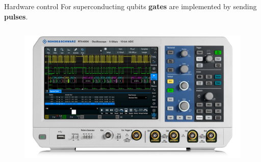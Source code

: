 \documentclass[11pt]{beamer}
\begin{document}


    

\begin{frame}{Hardware control}
    For superconducting qubits \textbf{gates} are implemented by sending \textbf{pulses}.

    \begin{columns}
        \begin{column}{0.5 \textwidth}
            \begin{figure}
                \includegraphics[height = 0.3 \textheight]{figures/rohde.jpg}
            \end{figure}
            

\end{column}
\end{columns}
\end{frame}
\end{document}
